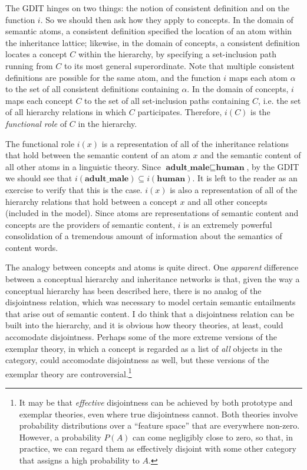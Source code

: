 The GDIT hinges on two things: the notion of consistent definition and on the function $i$. So we should then ask how they apply to concepts. In the domain of semantic atoms, a consistent definition specified the location of an atom within the inheritance lattice; likewise, in the domain of concepts, a consistent definition locates a concept $C$ within the hierarchy, by specifying a set-inclusion path running from $C$ to its most general superordinate. Note that multiple consistent definitions are possible for the same atom, and the function $i$ maps each atom $\alpha$ to the set of all consistent definitions containing $\alpha$. In the domain of concepts, $i$ maps each concept $C$ to the set of all set-inclusion paths containing $C$, i.e. the set of all hierarchy relations in which $C$ participates. Therefore, $i(C)$ is the \emph{functional role} of $C$ in the hierarchy.

The functional role $i(x)$ is a representation of all of the inheritance relations that hold between the semantic content of an atom $x$ and the semantic content of all other atoms in a linguistic theory. Since $\textbf{adult\_male}\sqsubseteq\textbf{human}$, by the GDIT we should see that $i(\textbf{adult\_male})\subseteq i(\textbf{human})$. It is left to the reader as an exercise to verify that this is the case. $i(x)$ is also a representation of all of the hierarchy relations that hold between a concept $x$ and all other concepts (included in the model). Since atoms are representations of semantic content and concepts are the providers of semantic content, $i$ is an extremely powerful consolidation of a tremendous amount of information about the semantics of content words.

The analogy between concepts and atoms is quite direct. One \emph{apparent} difference between a conceptual hierarchy and inheritance networks is that, given the way a conceptual hierarchy has been described here, there is no analog of the disjointness relation, which was necessary to model certain semantic entailments that arise out of semantic content. I do think that a disjointness relation can be built into the hierarchy, and it is obvious how theory theories, at least, could accomodate disjointness. Perhaps some of the more extreme versions of the exemplar theory, in which a concept is regarded as a list of \emph{all} objects in the category, could accomodate disjointness as well, but these versions of the exemplar theory are controversial.\footnote{It may be that \emph{effective} disjointness can be achieved by both prototype and exemplar theories, even where true disjointness cannot. Both theories involve probability distributions over a ``feature space'' that are everywhere non-zero. However, a probability $P(A)$ can come negligibly close to zero, so that, in practice, we can regard them as effectively disjoint with some other category that assigns a high probability to $A$.}

